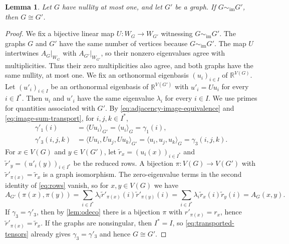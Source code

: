 \documentclass[11pt,a4paper]{article}
\theoremstyle{plain}
\newtheorem{lemma}[theorem]{Lemma}
\theoremstyle{definition}
\newcommand{\R}{\mathbb{R}}
\begin{document}
\begin{lemma}\label{lem:reconstruction}
 Let $G$ have nullity at most one, and let $G'$ be a graph.
 If $G\sim_{\mathrm{im}}G'$, then $G\cong G'$.
\end{lemma}
\begin{proof}
  We fix a bijective linear map $U:W_G\to W_{G'}$ witnessing
  $G\sim_{\mathrm{im}}G'$.
  The graphs $G$ and $G'$ have the same number of vertices because
  $G\sim_{\mathrm{im}}G'$. The map $U$ intertwines
  $A_G|_{W_G}$ with $A_{G'}|_{W_{G'}}$, so their nonzero eigenvalues agree
  with multiplicities. Thus their zero multiplicities also agree,
  and both graphs have the same nullity, at most one.
  We fix an orthonormal eigenbasis
  $(u_i)_{i\in I}$ of $\R^{V(G)}$.
  Let $(u'_i)_{i\in I}$ be an orthonormal eigenbasis of $\R^{V(G')}$
  with $u'_i=Uu_i$ for every $i\in I^*$.
  Then $u_i$ and $u'_i$ have the same eigenvalue $\lambda_i$ for every
  $i\in I$. We use primes for quantities associated with $G'$.
  By \cref{eq:adjacency-image-equivalence} and
  \cref{eq:image-sum-transport}, for $i,j,k\in I^*$,
  \begin{equation}\label{eq:transported-tensors}
    \begin{aligned}
      \gamma'_1(i)&=\langle Uu_i\rangle_{G'}
        =\langle u_i\rangle_G=\gamma_1(i),\\
      \gamma'_3(i,j,k)&=\langle Uu_i,Uu_j,Uu_k\rangle_{G'}
        =\langle u_i,u_j,u_k\rangle_G=\gamma_3(i,j,k).
    \end{aligned}
  \end{equation}
  For $x\in V(G)$ and $y\in V(G')$, let
  $\tilde{r}_x=(u_i(x))_{i\in I^*}$ and
  $\tilde{r}'_y=(u'_i(y))_{i\in I^*}$ be the reduced rows.
  A bijection $\pi:V(G)\to V(G')$ with $\tilde{r}'_{\pi(x)}=\tilde{r}_x$ is a
  graph isomorphism. The zero-eigenvalue terms in the second identity of
  \cref{eq:rows} vanish, so for $x,y\in V(G)$ we have
  \begin{equation}\label{eq:row-isomorphism}
    A_{G'}(\pi(x),\pi(y))
    =\sum_{i\in I^*}\lambda_i\tilde{r}'_{\pi(x)}(i)\tilde{r}'_{\pi(y)}(i)
    =\sum_{i\in I^*}\lambda_i\tilde{r}_x(i)\tilde{r}_y(i)=A_G(x,y).
  \end{equation}
  If $\gamma_3=\gamma'_3$, then by \cref{lem:odeco} there is a
  bijection $\pi$ with $r'_{\pi(x)}=r_x$, hence $\tilde{r}'_{\pi(x)}=\tilde{r}_x$.
  If the graphs are nonsingular, then $I^*=I$, so
  \cref{eq:transported-tensors} already gives $\gamma_3=\gamma'_3$
  and hence $G\cong G'$.


\end{proof}
\end{document}
